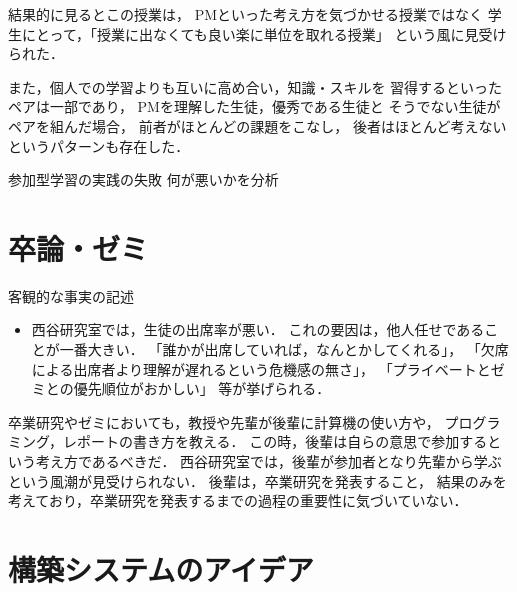 \documentclass{hissymp}
\begin{document}
結果的に見るとこの授業は，
PMといった考え方を気づかせる授業ではなく
学生にとって，「授業に出なくても良い楽に単位を取れる授業」
という風に見受けられた．

また，個人での学習よりも互いに高め合い，知識・スキルを
習得するといったペアは一部であり，
PMを理解した生徒，優秀である生徒と
そうでない生徒がペアを組んだ場合，
前者がほとんどの課題をこなし，
後者はほとんど考えないというパターンも存在した．

参加型学習の実践の失敗
何が悪いかを分析


\section{卒論・ゼミ}
\label{sec:orgd234283}

客観的な事実の記述
\begin{itemize}
\item 西谷研究室では，生徒の出席率が悪い．
これの要因は，他人任せであることが一番大きい．
「誰かが出席していれば，なんとかしてくれる」，
「欠席による出席者より理解が遅れるという危機感の無さ」，
「プライベートとゼミとの優先順位がおかしい」
等が挙げられる．
\end{itemize}



卒業研究やゼミにおいても，教授や先輩が後輩に計算機の使い方や，
プログラミング，レポートの書き方を教える．
この時，後輩は自らの意思で参加するという考え方であるべきだ．
西谷研究室では，後輩が参加者となり先輩から学ぶという風潮が見受けられない．
後輩は，卒業研究を発表すること，
結果のみを考えており，卒業研究を発表するまでの過程の重要性に気づいていない．

\section{構築システムのアイデア}
\label{sec:org13d3b00}
\end{document}
